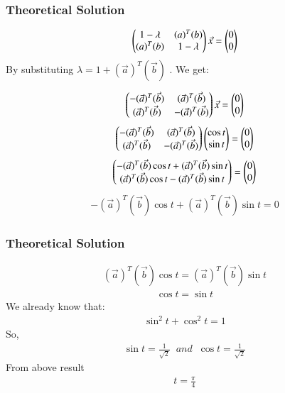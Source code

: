 \documentclass{beamer}
\begin{document}
\begin{frame}
\frametitle{Theoretical Solution}
\begin{align}
    \begin{pmatrix}1-\lambda&(a)^T(b)\\(a)^T(b)&1-\lambda\end{pmatrix}\Vec{x}=\begin{pmatrix}0\\0\end{pmatrix}
\end{align}
By substituting  $\lambda = 1+  (\Vec{a})^T(\Vec{b}) $ . We get:

\begin{align}
    \begin{pmatrix}-(\Vec{a})^T(\Vec{b})&(\Vec{a})^T(\Vec{b})\\(\Vec{a})^T(\Vec{b})&-(\Vec{a})^T(\Vec{b})\end{pmatrix}\Vec{x}=\begin{pmatrix}0\\0\end{pmatrix}
\end{align}
\begin{align}
    \begin{pmatrix}-(\Vec{a})^T(\Vec{b})&(\Vec{a})^T(\Vec{b})\\(\Vec{a})^T(\Vec{b})&-(\Vec{a})^T(\Vec{b})\end{pmatrix}\begin{pmatrix}\cos{t}\\\sin{t}\end{pmatrix}=\begin{pmatrix}0\\0\end{pmatrix}
\end{align}
\begin{align}
    \begin{pmatrix}-(\Vec{a})^T(\Vec{b})\cos{t}+(\Vec{a})^T(\Vec{b})\sin{t}\\(\Vec{a})^T(\Vec{b})\cos{t}-(\Vec{a})^T(\Vec{b})\sin{t}\end{pmatrix}=\begin{pmatrix}0\\0\end{pmatrix}
\end{align}
\begin{align}
    -(\Vec{a})^T(\Vec{b})\cos{t}+(\Vec{a})^T(\Vec{b})\sin{t}=0
\end{align}




\end{frame}
\begin{frame}
\frametitle{Theoretical Solution}
   \begin{align}
    (\Vec{a})^T(\Vec{b})\cos{t}=(\Vec{a})^T(\Vec{b})\sin{t}
\end{align}
\begin{align}
    \cos{t}=\sin{t}
\end{align}
We already know that:
\begin{align}
    \sin^2{t}+\cos^2{t}=1
\end{align}
So,
\begin{align}
    \sin{t}=\frac{1}{\sqrt{2}}\;\;and\;\; \cos{t}=\frac{1}{\sqrt{2}}
\end{align}
From above result
\begin{align}
    t=\frac{\pi}{4}
\end{align}


\end{frame}
\end{document}
